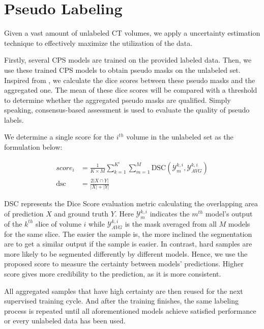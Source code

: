 \section{Pseudo Labeling}
\label{sec:labeling}


Given a vast amount of unlabeled CT volumes, we apply a uncertainty estimation technique to effectively maximize the utilization of the data.

Firstly, several CPS models are trained on the provided labeled data.
Then, we use these trained CPS models to obtain pseudo masks on the unlabeled set. Inspired from \cite{wang2019active}, we calculate the dice scores between these pseudo masks and the aggregated one. The mean of these dice scores will be compared with a threshold to determine whether the aggregated pseudo masks are qualified. Simply speaking, consensus-based assessment is used to evaluate the quality of pseudo labels.

We determine a single score for the $i^{th}$ volume in the unlabeled set as the formulation below:

\begin{align}
        score_{i} &= \frac{1}{K \times M} \sum_{k=1}^{K^{i}} \sum_{m=1}^{M} \text{DSC}(\mathcal{Y}^{k,i}_{m}, \mathcal{Y}^{k,i}_{AVG}) \\
        \text{dsc}  &= \frac{2 |X \cap Y|}{|X| + |Y|}
\end{align}

DSC represents the Dice Score evaluation metric calculating the overlapping area of prediction $X$ and ground truth $Y$. 
Here $\mathcal{Y}^{k,i}_{m}$ indicates the $m^{th}$ model’s output of the $k^{th}$ slice of volume $i$ while $\mathcal{Y}^{k,i}_{AVG}$ is the mask averaged from all $M$ models for the same slice. The easier the sample is, the more inclined the segmentation are to get a similar output if the sample is easier. In contrast, hard samples are more likely to be segmented differently by different models. Hence, we use the proposed score to measure the certainty between models' predictions. Higher score gives more credibility to the prediction, as it is more consistent. 

All aggregated samples that have high certainty are then reused for the next supervised training cycle. And after the training finishes, the same labeling process is repeated until all aforementioned models achieve satisfied performance or every unlabeled data has been used.